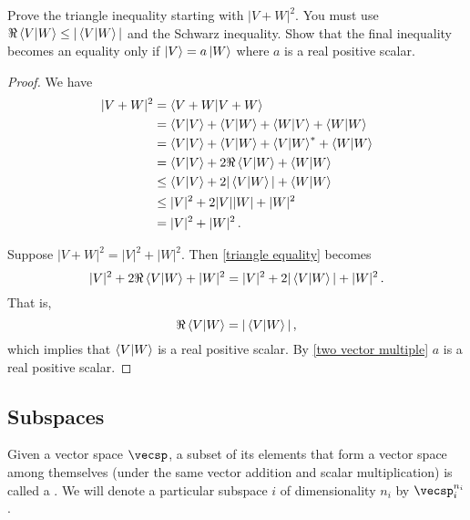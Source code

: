 \begin{exercise}
Prove the triangle inequality starting with $|V + W|^2$. You must use $\real \braket{V}{W} \leq |\braket{V}{W}|$ and the Schwarz inequality. Show that the final inequality becomes an equality only if $\ket{V} = a\ket{W}$ where $a$ is a real positive scalar.
\end{exercise}

\begin{proof} We have
\begin{align}\label{triangle equality}
    |V + W|^2 &= \braket{V + W}{V + W} \nonumber \\
    &= \braket{V} + \braket{V}{W} + \braket{W}{V} + \braket{W} \nonumber \\
    &= \braket{V} + \braket{V}{W} + \braket{V}{W}^* + \braket{W} \nonumber \\
    &= \braket{V} + 2\real\braket{V}{W} + \braket{W} \nonumber \\
    &\leq \braket{V} + 2|\braket{V}{W}| + \braket{W} \\
    &\leq |V|^2 + 2|V||W| + |W|^2 \nonumber \\
    &= |V|^2 + |W|^2\,. \nonumber
\end{align}

Suppose $|V + W|^2 = |V|^2 + |W|^2$. Then \eqref{triangle equality} becomes
\begin{equation}
    |V|^2 + 2\real \braket{V}{W} + |W|^2 = |V|^2 + 2|\braket{V}{W}| + |W|^2\,.
\end{equation}
That is,
\begin{equation}
    \real \braket{V}{W} = |\braket{V}{W}|\,,
\end{equation}
which implies that $\braket{V}{W}$ is a real positive scalar. By \eqref{two vector multiple} $a$ is a real positive scalar.
\end{proof}


\subsection{Subspaces}

Given a vector space $\vecsp$, a subset of its elements that form a vector space among themselves (under the same vector addition and scalar multiplication) is called a . We will denote a particular subspace $i$ of dimensionality $n_i$ by $\vecsp_i^{n_i}$.

